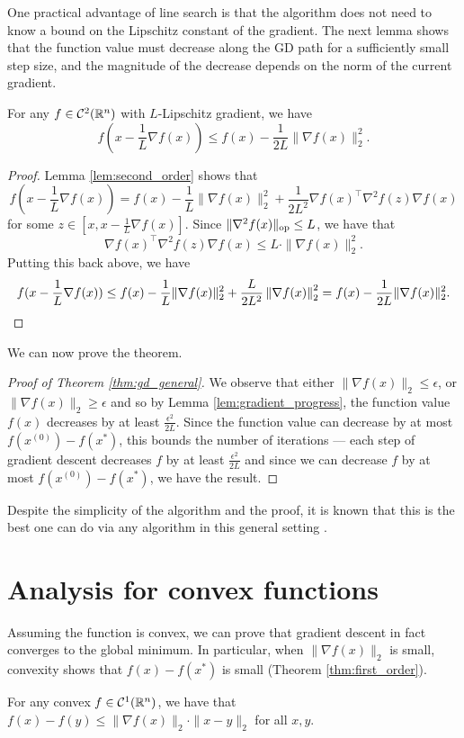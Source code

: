 One practical advantage of line search is that the algorithm does
not need to know a bound on the Lipschitz constant of the gradient.
The next lemma shows that the function value must decrease along the
GD path for a sufficiently small step size, and the magnitude of the
decrease depends on the norm of the current gradient.
\begin{lem}
\label{lem:gradient_progress}For any $f\in\mathcal{C}^{2}(\mathbb{R}^{n})$
with $L$-Lipschitz gradient, we have
\[
f(x-\frac{1}{L}\nabla f(x))\leq f(x)-\frac{1}{2L}\|\nabla f(x)\|^{2}_{2}.
\]
\end{lem}

\begin{proof}
Lemma \ref{lem:second_order} shows that 
\[
f(x-\frac{1}{L}\nabla f(x))=f(x)-\frac{1}{L}\|\nabla f(x)\|^{2}_{2}+\frac{1}{2L^{2}}\nabla f(x)^{\top}\nabla^{2}f(z)\nabla f(x)
\]
for some $z\in[x,x-\frac{1}{L}\nabla f(x)]$. Since $\|\nabla^{2}f(x)\|_{\mathrm{op}}\leq L$,
we have that 
\[
\nabla f(x)^{\top}\nabla^{2}f(z)\nabla f(x)\leq L\cdot\|\nabla f(x)\|^{2}_{2}.
\]
Putting this back above, we have 
\[
f(x-\frac{1}{L}\nabla f(x))\le f(x)-\frac{1}{L}\|\nabla f(x)\|^{2}_{2}+\frac{L}{2L^{2}}\left\Vert \nabla f(x)\right\Vert^{2}_{2}=f(x)-\frac{1}{2L}\|\nabla f(x)\|^{2}_{2}.
\]
\end{proof}
We can now prove the theorem. 
\begin{proof}[Proof of Theorem \ref{thm:gd_general}]
 We observe that either $\|\nabla f(x)\|_{2}\le\epsilon$, or $\|\nabla f(x)\|_{2}\geq\epsilon$
and so by Lemma \ref{lem:gradient_progress}, the function value $f(x)$
decreases by at least $\frac{\epsilon^{2}}{2L}$. Since the function
value can decrease by at most $f(x^{(0)})-f(x^{*})$, this bounds
the number of iterations --- each step of gradient descent decreases
$f$ by at least $\frac{\epsilon^{2}}{2L}$ and since we can decrease
$f$ by at most $f(x^{(0)})-f(x^{*})$, we have the result.
\end{proof}
Despite the simplicity of the algorithm and the proof, it is known
that this is the best one can do via any algorithm in this general
setting \cite{carmon2017lower}.

\section{Analysis for convex functions}

Assuming the function is convex, we can prove that gradient descent
in fact converges to the global minimum. In particular, when $\|\nabla f(x)\|_{2}$
is small, convexity shows that $f(x)-f(x^{*})$ is small (Theorem
\ref{thm:first_order}).
\begin{lem}
\label{lem:f_diff_diameter}For any convex $f\in\mathcal{C}^{1}(\mathbb{R}^{n})$,
we have that $f(x)-f(y)\leq\|\nabla f(x)\|_{2}\cdot\|x-y\|_{2}$ for
all $x,y$.
\end{lem}


